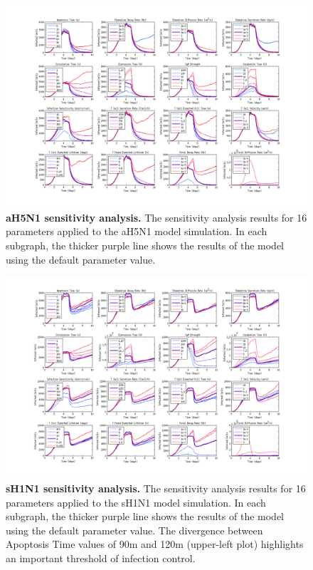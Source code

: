 \documentclass[preprint,10pt,authoryear]{article}
\begin{document}
\pagebreak
\begin{landscape}

\begin{figure}[ht!]
\begin{center}
	\includegraphics[width=9in]{Figure_S4}
	\caption{\textbf{aH5N1 sensitivity analysis.} The sensitivity analysis results for 16 parameters applied to the aH5N1 model simulation.  In each subgraph, the thicker purple line shows the results of the model using the default parameter value.}
	\label{fig:asensitivity}
\end{center}
\end{figure}

\begin{figure}[ht!]
\begin{center}
	\includegraphics[width=9in]{Figure_S5}
	\caption{\textbf{sH1N1 sensitivity analysis.} The sensitivity analysis results for 16 parameters applied to the sH1N1 model simulation.  In each subgraph, the thicker purple line shows the results of the model using the default parameter value.  The divergence between Apoptosis Time values of 90m and 120m (upper-left plot) highlights an important threshold of infection control.}
	\label{fig:ssensitivity}
\end{center}
\end{figure}


\end{landscape}
\end{document}
